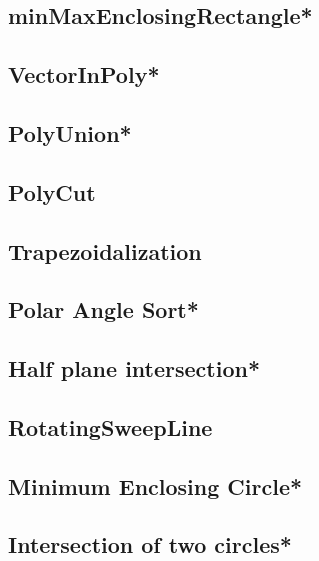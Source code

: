 \subsection{minMaxEnclosingRectangle*} %

\subsection{VectorInPoly*} %

\subsection{PolyUnion*} %

\subsection{PolyCut}

\subsection{Trapezoidalization} %

\subsection{Polar Angle Sort*} %

\subsection{Half plane intersection*} %

\subsection{RotatingSweepLine}

\subsection{Minimum Enclosing Circle*} %

\subsection{Intersection of two circles*} %

